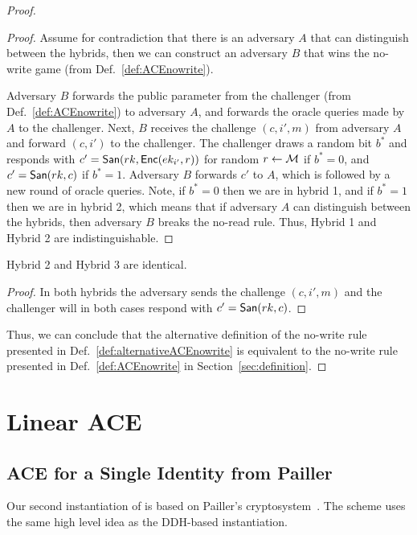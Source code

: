\documentclass{llncs}
\begin{document}
\begin{proof}
\begin{proof}
Assume for contradiction that there is an adversary $A$ that can distinguish between the hybrids, then we can construct an adversary $B$ that wins the no-write game (from Def.~\ref{def:ACEnowrite}).

Adversary $B$ forwards the public parameter from the challenger (from Def.~\ref{def:ACEnowrite}) to adversary $A$, and forwards the oracle queries made by $A$ to the challenger. 
Next, $B$ receives the challenge $(c,i',m)$ from adversary $A$ and forward $(c,i')$ to the challenger.
The challenger draws a random bit $b^*$ and responds with $c' = \mathsf{San}(rk,\mathsf{Enc}(ek_{i'},r))$ for random $r \leftarrow \mathcal{M}$ if $b^*=0$, and $c' = \mathsf{San}(rk,c)$ if $b^*=1$. 
Adversary $B$ forwards $c'$ to $A$, which is followed by a new round of oracle queries. 
Note, if $b^*=0$ then we are in hybrid 1, and if $b^*=1$ then we are in hybrid 2, which means that if adversary $A$ can distinguish between the hybrids, then adversary $B$ breaks the no-read rule. Thus, Hybrid 1 and Hybrid 2 are indistinguishable.
\end{proof}

\begin{claim}
Hybrid 2 and Hybrid 3 are identical.
\end{claim}

\begin{proof}
In both hybrids the adversary sends the challenge $(c,i',m)$ and the challenger will in both cases respond with $c' = \mathsf{San}(rk,c)$.
\end{proof}

Thus, we can conclude that the alternative definition of the no-write rule presented in Def.~\ref{def:alternativeACEnowrite} is equivalent to the no-write rule presented in Def.~\ref{def:ACEnowrite} in Section~\ref{sec:definition}.
\end{proof}





\section{Linear ACE}

\subsection{ACE for a Single Identity from Pailler}\label{app:onepailler}

Our second instantiation of \oACE is based on Pailler's cryptosystem~\cite{DBLP:conf/eurocrypt/Paillier99,DBLP:conf/pkc/DamgardJ01}. The scheme uses the same high level idea as the DDH-based instantiation.
\end{document}
